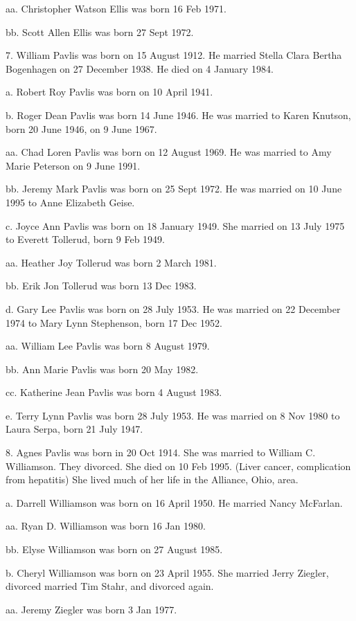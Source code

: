 \documentclass[a4paper]{article}
\begin{document}
aa. Christopher Watson Ellis was born 16 Feb 1971.

bb. Scott Allen Ellis was born 27 Sept 1972.

7. William Pavlis was born on 15 August 1912.  He married Stella Clara Bertha Bogenhagen on 27 December 1938.  He died on 4 January 1984.

a. Robert Roy Pavlis was born on 10 April 1941. 

b. Roger Dean Pavlis was born 14 June 1946.  He was married to Karen Knutson, born 20 June 1946, on 9 June 1967.

aa. Chad Loren Pavlis was born on 12 August 1969.  He was married to Amy Marie Peterson on 9 June 1991.

bb. Jeremy Mark Pavlis was born on 25 Sept 1972.  He was married on 10 June 1995 to Anne Elizabeth Geise.

c. Joyce Ann Pavlis was born on 18 January 1949.  She married on 13 July 1975 to Everett Tollerud, born 9 Feb 1949.  

aa. Heather Joy Tollerud was born 2 March 1981.

bb. Erik Jon Tollerud was born 13 Dec 1983.

d. Gary Lee Pavlis was born on 28 July 1953.  He was married on 22 December 1974 to Mary Lynn Stephenson, born 17 Dec 1952.

aa. William Lee Pavlis was born 8 August 1979.

bb. Ann Marie Pavlis was born 20 May 1982.

cc. Katherine Jean Pavlis was born 4 August 1983.

e. Terry Lynn Pavlis was born 28 July 1953.  He was married on 8 Nov 1980 to Laura Serpa, born 21 July 1947.  

8. Agnes Pavlis was born in 20 Oct 1914.  She was married to William C. Williamson.  They divorced.  She died on 10 Feb 1995.  (Liver cancer, complication from hepatitis)  She lived much of her life in the Alliance, Ohio, area.

a. Darrell Williamson was born on 16 April 1950.  He married Nancy McFarlan.

aa. Ryan D. Williamson was born 16 Jan 1980.

bb. Elyse Williamson was born on 27 August 1985.

b. Cheryl Williamson was born on 23 April 1955.  She married Jerry Ziegler, divorced married Tim Stahr, and divorced again.

aa. Jeremy Ziegler was born 3 Jan 1977.
\end{document}

